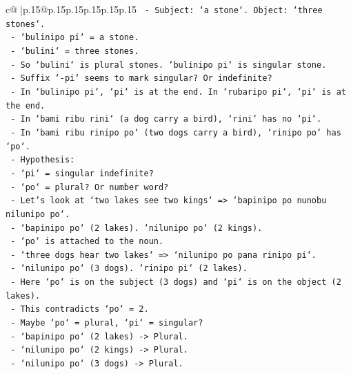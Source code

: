 \documentclass{article}
\begin{document}
{\begin{supertabular}{c@{$\;$}|p{.15\linewidth}@{}p{.15\linewidth}p{.15\linewidth}p{.15\linewidth}p{.15\linewidth}p{.15\linewidth}}
{{{\texttt{                 {-} Subject: `a stone`. Object: `three stones`.} \\
\texttt{                 {-} `bulinipo pi` = a stone.} \\
\texttt{                 {-} `bulini` = three stones.} \\
\texttt{                 {-} So `bulini` is plural stones. `bulinipo pi` is singular stone.} \\
\texttt{                 {-} Suffix `{-}pi` seems to mark singular? Or indefinite?} \\
\texttt{                 {-} In `bulinipo pi`, `pi` is at the end. In `rubaripo pi`, `pi` is at the end.} \\
\texttt{                 {-} In `bami ribu rini` (a dog carry a bird), `rini` has no `pi`.} \\
\texttt{                 {-} In `bami ribu rinipo po` (two dogs carry a bird), `rinipo po` has `po`.} \\
\texttt{                 {-} Hypothesis:} \\
\texttt{                   {-} `pi` = singular indefinite?} \\
\texttt{                   {-} `po` = plural? Or number word?} \\
\texttt{                   {-} Let's look at `two lakes see two kings` => `bapinipo po nunobu nilunipo po`.} \\
\texttt{                     {-} `bapinipo po` (2 lakes). `nilunipo po` (2 kings).} \\
\texttt{                     {-} `po` is attached to the noun.} \\
\texttt{                   {-} `three dogs hear two lakes` => `nilunipo po pana rinipo pi`.} \\
\texttt{                     {-} `nilunipo po` (3 dogs). `rinipo pi` (2 lakes).} \\
\texttt{                     {-} Here `po` is on the subject (3 dogs) and `pi` is on the object (2 lakes).} \\
\texttt{                     {-} This contradicts `po` = 2.} \\
\texttt{                     {-} Maybe `po` = plural, `pi` = singular?} \\
\texttt{                     {-} `bapinipo po` (2 lakes) {-}> Plural.} \\
\texttt{                     {-} `nilunipo po` (2 kings) {-}> Plural.} \\
\texttt{                     {-} `nilunipo po` (3 dogs) {-}> Plural.} \\
}}}
\end{supertabular}}
\end{document}
